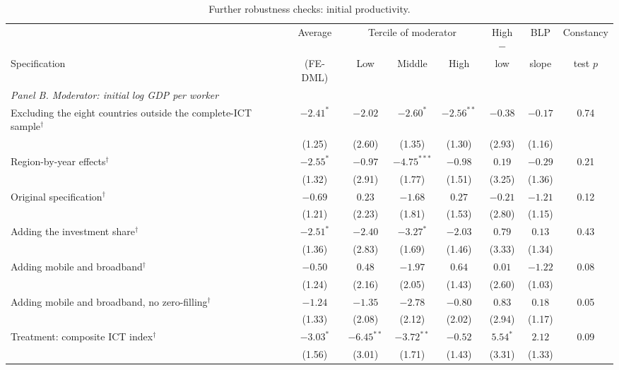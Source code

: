 \documentclass[preprint,12pt,authoryear]{elsarticle}
\begin{document}
\begin{table}[!p]
\centering
\begin{threeparttable}
\caption{Further robustness checks: initial productivity.}\label{tab:empappbc}
\scriptsize
\setlength{\tabcolsep}{3pt}
\begin{tabular}{lccccccc}
\toprule
 & Average & \multicolumn{3}{c}{Tercile of moderator} & High $-$ & BLP & Constancy\\
\cmidrule(lr){3-5}
Specification & (FE-DML) & Low & Middle & High & low & slope & test $p$\\
\midrule
\multicolumn{8}{l}{\textit{Panel B. Moderator: initial log GDP per worker}}\\
\quad Excluding the eight countries outside the complete-ICT sample$^{\dagger}$ & $-2.41^{*}$ & $-2.02$ & $-2.60^{*}$ & $-2.56^{**}$ & $-0.38$ & $-0.17$ & 0.74\\
 & (1.25) & (2.60) & (1.35) & (1.30) & (2.93) & (1.16) & \\
\quad Region-by-year effects$^{\dagger}$ & $-2.55^{*}$ & $-0.97$ & $-4.75^{***}$ & $-0.98$ & $0.19$ & $-0.29$ & 0.21\\
 & (1.32) & (2.91) & (1.77) & (1.51) & (3.25) & (1.36) & \\
\quad Original specification$^{\dagger}$ & $-0.69$ & $0.23$ & $-1.68$ & $0.27$ & $-0.21$ & $-1.21$ & 0.12\\
 & (1.21) & (2.23) & (1.81) & (1.53) & (2.80) & (1.15) & \\
\quad Adding the investment share$^{\dagger}$ & $-2.51^{*}$ & $-2.40$ & $-3.27^{*}$ & $-2.03$ & $0.79$ & $0.13$ & 0.43\\
 & (1.36) & (2.83) & (1.69) & (1.46) & (3.33) & (1.34) & \\
\quad Adding mobile and broadband$^{\dagger}$ & $-0.50$ & $0.48$ & $-1.97$ & $0.64$ & $0.01$ & $-1.22$ & 0.08\\
 & (1.24) & (2.16) & (2.05) & (1.43) & (2.60) & (1.03) & \\
\quad Adding mobile and broadband, no zero-filling$^{\dagger}$ & $-1.24$ & $-1.35$ & $-2.78$ & $-0.80$ & $0.83$ & $0.18$ & 0.05\\
 & (1.33) & (2.08) & (2.12) & (2.02) & (2.94) & (1.17) & \\
\quad Treatment: composite ICT index$^{\dagger}$ & $-3.03^{*}$ & $-6.45^{**}$ & $-3.72^{**}$ & $-0.52$ & $5.54^{*}$ & $2.12$ & 0.09\\
 & (1.56) & (3.01) & (1.71) & (1.43) & (3.31) & (1.33) & \\

\end{tabular}
\end{threeparttable}
\end{table}
\end{document}
